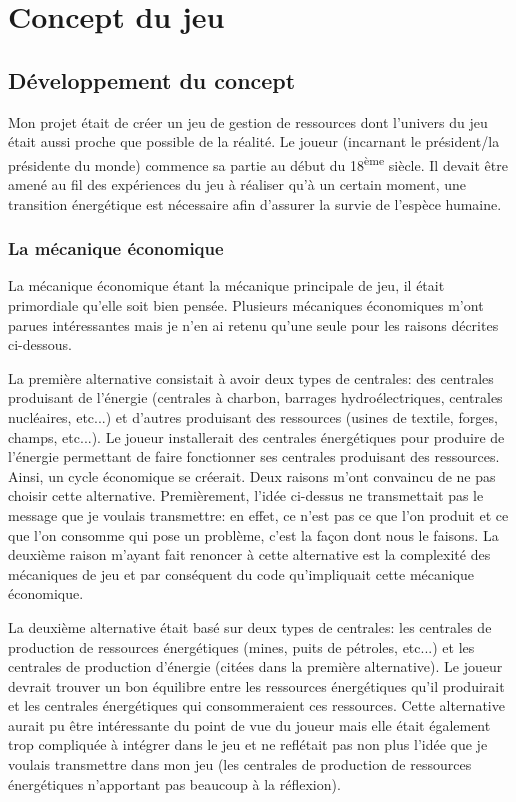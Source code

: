 \documentclass{article}
\begin{document}
        \section{Concept du jeu}
        \subsection{Développement du concept}
        
        Mon projet était de créer un jeu de gestion de ressources dont l'univers du jeu était aussi proche que possible de la réalité. Le joueur (incarnant le président/la présidente du monde) commence sa partie au début du 18\textsuperscript{ème} siècle. Il devait être amené au fil des expériences du jeu à réaliser qu'à un certain moment, une transition énergétique est nécessaire afin d'assurer la survie de l'espèce humaine.
        
        \subsubsection{La mécanique économique}
        La mécanique économique étant la mécanique principale de jeu, il était primordiale qu'elle soit bien pensée.
        Plusieurs mécaniques économiques m'ont parues intéressantes mais je n'en ai retenu qu'une seule pour les raisons décrites ci-dessous.
        
        
        La première alternative consistait à avoir deux types de centrales: des centrales produisant de l'énergie (centrales à charbon, barrages hydroélectriques, centrales nucléaires, etc...) et d'autres produisant des ressources (usines de textile, forges, champs, etc...). Le joueur installerait des centrales énergétiques pour produire de l'énergie permettant de faire fonctionner ses centrales produisant des ressources. Ainsi, un cycle économique se créerait. 
        Deux raisons m'ont convaincu de ne pas choisir cette alternative. Premièrement, l'idée ci-dessus ne transmettait pas le message que je voulais transmettre: en effet, ce n'est pas ce que l'on produit et ce que l'on consomme qui pose un problème, c'est la façon dont nous le faisons. La deuxième raison m'ayant fait renoncer à cette alternative est la complexité des mécaniques de jeu et par conséquent du code qu'impliquait cette mécanique économique.
        
        
        La deuxième alternative était basé sur deux types de centrales: les centrales de production de ressources énergétiques (mines, puits de pétroles, etc...) et les centrales de production d'énergie (citées dans la première alternative). Le joueur devrait trouver un bon équilibre entre les ressources énergétiques qu'il produirait et les centrales énergétiques qui consommeraient ces ressources.
        Cette alternative aurait pu être intéressante du point de vue du joueur mais elle était également trop compliquée à intégrer dans le jeu et ne reflétait pas non plus l'idée que je voulais transmettre dans mon jeu (les centrales de production de ressources énergétiques n'apportant pas beaucoup à la réflexion).
        
\end{document}
